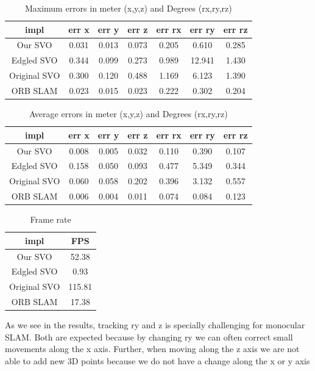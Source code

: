 \documentclass[11pt,a4paper,titlepage,oneside]{report}
\begin{document}
\begin{table}[H]
  \centering
  \begin{tabular}{|c|c|c|c|c|c|c|}
    impl & err x & err y & err z & err rx & err ry & err rz\\
    \hline
    Our SVO & 0.031 & 0.013 & 0.073 & 0.205 & 0.610 & 0.285\\
    Edgled SVO & 0.344 & 0.099 & 0.273 & 0.989 & 12.941 & 1.430\\
    Original SVO & 0.300 & 0.120 & 0.488 & 1.169 & 6.123 & 1.390\\
    ORB SLAM& 0.023 & 0.015 & 0.023 & 0.222 & 0.302 & 0.204
  \end{tabular}
  \caption{Maximum errors in meter (x,y,z) and Degrees (rx,ry,rz)}
  \label{tab:maximas}
\end{table}

\begin{table}[H]
  \centering
  \begin{tabular}{|c|c|c|c|c|c|c|}
  impl & err x & err y & err z & err rx & err ry & err rz\\
  \hline
  Our SVO & 0.008 & 0.005 & 0.032 & 0.110 & 0.390 & 0.107\\
  Edgled SVO & 0.158 & 0.050 & 0.093 & 0.477 & 5.349 & 0.344\\
  Original SVO & 0.060 & 0.058 & 0.202 & 0.396 & 3.132 & 0.557\\
  ORB SLAM & 0.006 & 0.004 & 0.011 & 0.074 & 0.084 & 0.123
\end{tabular}

\caption{Average errors in meter (x,y,z) and Degrees (rx,ry,rz)}
\label{tab:average}
\end{table}

\begin{table}[H]
  \centering
  \begin{tabular}{|c|c|}
  impl & FPS\\
  \hline
  Our SVO & 52.38\\
  Edgled SVO & 0.93\\
  Original SVO & 115.81\\
  ORB SLAM & 17.38
\end{tabular}
\caption{Frame rate}
\label{tab:fps}
\end{table}

As we see in the results, tracking ry and z is specially challenging for monocular SLAM. Both are expected because by changing ry we can often correct small movements along the x axis. Further, when moving along the z axis we are not able to add new 3D points because we do not have a change along the x or y axis
\end{document}
